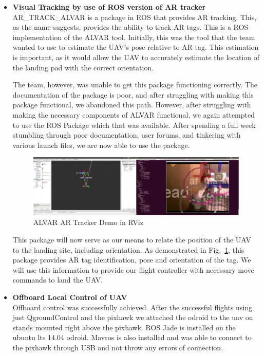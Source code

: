 \begin{itemize}
\begin{itemize}
\item \textbf{Visual Tracking by use of ROS version of AR tracker}\\
AR\_TRACK\_ALVAR is a package in ROS that provides AR tracking. This, as the name suggests, provides the ability to track AR tags. This is a ROS implementation of the ALVAR tool. Initially, this was the tool that the team wanted to use to estimate the UAV's pose relative to AR tag. This estimation is important, as it would allow the UAV to accurately estimate the location of the landing pad with the correct orientation. \par
The team, however, was unable to get this package functioning correctly. The documentation of the package is poor, and after struggling with making this package functional, we abandoned this path. However, after struggling with making the necessary components of ALVAR functional, we again attempted to use the ROS Package which that was available. After spending a full week stumbling through poor documentation, user forums, and tinkering with various launch files, we are now able to use the package.\par
\begin{figure}[h]
\includegraphics[width=7in]{artrackdemo.png}
\centering
\caption{ALVAR AR Tracker Demo in RViz}
\label{fig:artracker}
\end{figure}
This package will now serve as our means to relate the position of the UAV to the landing site, including orientation. As demonstrated in Fig.~\ref{fig:artracker}, this package provides AR tag identification, pose and orientation of the tag. We will use this information to provide our flight controller with necessary move commands to land the UAV.\par

\item \textbf{Offboard Local Control of UAV}\\
Offboard control was successfully achieved. After the successful flights using just QgroundControl and the pixhawk we attached the odroid to the uav on stands mounted right above the pixhawk. ROS Jade is installed on the ubuntu lts 14.04 odroid. Mavros is also installed and was able to connect to the pixhawk through USB and not throw any errors of connection.\par


\end{itemize}
\end{itemize}
